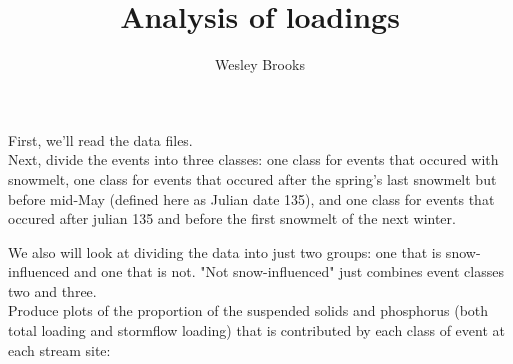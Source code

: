 \documentclass[12pt]{article}
\title{Analysis of loadings}
\author{Wesley Brooks}
\date{}                                           %
\begin{document}
\maketitle

First, we'll read the data files.\\



Next, divide the events into three classes: one class for events that occured with snowmelt, one class for events that occured after the spring's last snowmelt but before mid-May (defined here as Julian date 135), and one class for events that occured after julian 135 and before the first snowmelt of the next winter.

We also will look at dividing the data into just two groups: one that is snow-influenced and one that is not. "Not snow-influenced" just combines event classes two and three.\\





Produce plots of the proportion of the suspended solids and phosphorus (both total loading and stormflow loading) that is contributed by each class of event at each stream site:\\
\end{document}
